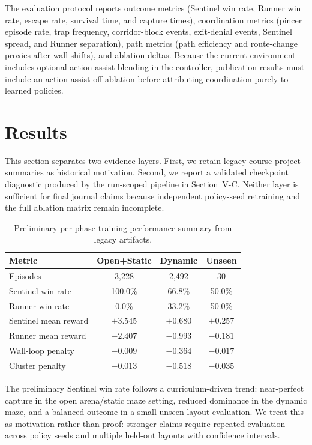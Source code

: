 \documentclass[conference]{IEEEtran}
\begin{document}
The evaluation protocol reports outcome metrics (Sentinel win rate, Runner win rate, escape rate, survival time, and capture times), coordination metrics (pincer episode rate, trap frequency, corridor-block events, exit-denial events, Sentinel spread, and Runner separation), path metrics (path efficiency and route-change proxies after wall shifts), and ablation deltas. Because the current environment includes optional action-assist blending in the controller, publication results must include an action-assist-off ablation before attributing coordination purely to learned policies.

\section{Results}

This section separates two evidence layers. First, we retain legacy course-project summaries as historical motivation. Second, we report a validated checkpoint diagnostic produced by the run-scoped pipeline in Section~V-C. Neither layer is sufficient for final journal claims because independent policy-seed retraining and the full ablation matrix remain incomplete.

\begin{table}[t]
\centering
\caption{Preliminary per-phase training performance summary from legacy artifacts.}
\label{tab:phase_results}
\begin{tabular}{lccc}
\toprule
Metric & Open+Static & Dynamic & Unseen \\
\midrule
Episodes & 3{,}228 & 2{,}492 & 30 \\
Sentinel win rate & 100.0\% & 66.8\% & 50.0\% \\
Runner win rate & 0.0\% & 33.2\% & 50.0\% \\
Sentinel mean reward & $+3.545$ & $+0.680$ & $+0.257$ \\
Runner mean reward & $-2.407$ & $-0.993$ & $-0.181$ \\
Wall-loop penalty & $-0.009$ & $-0.364$ & $-0.017$ \\
Cluster penalty & $-0.013$ & $-0.518$ & $-0.035$ \\
\bottomrule
\end{tabular}
\end{table}

The preliminary Sentinel win rate follows a curriculum-driven trend: near-perfect capture in the open arena/static maze setting, reduced dominance in the dynamic maze, and a balanced outcome in a small unseen-layout evaluation. We treat this as motivation rather than proof: stronger claims require repeated evaluation across policy seeds and multiple held-out layouts with confidence intervals.
\end{document}

